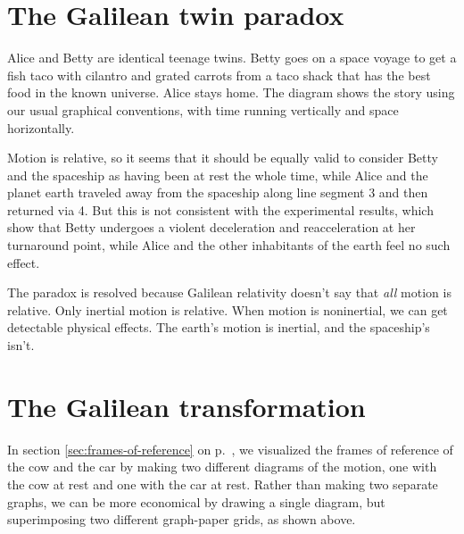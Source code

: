 \section{The Galilean twin paradox}\label{sec:galilean-twin-paradox}

Alice and Betty are identical teenage twins. Betty goes on a space voyage to get a fish taco with
cilantro and grated carrots from a
taco shack that has the best food in the known universe. Alice stays home. The diagram shows the story using our usual
graphical conventions, with time running vertically and space horizontally.

\begin{figure}[h]\label{fig:galilean-twin-paradox}
\end{figure}

Motion is relative, so it seems that it should be equally valid to consider Betty
and the spaceship as having been at rest the whole time, while
Alice and the planet earth traveled away from the spaceship along
line segment 3 and then returned via 4. But this is not consistent with the
experimental results, which show that Betty undergoes a violent
deceleration and reacceleration at her turnaround point, while Alice and the other
inhabitants of the earth feel no such effect.

The paradox is resolved because Galilean relativity doesn't say that \emph{all}
motion is relative. Only inertial motion is relative. When motion is noninertial, we can get detectable
physical effects. The earth's motion is inertial, and the spaceship's isn't.


\pagebreak

\section{The Galilean transformation}\label{sec:galilean-transformation}

\begin{figure}\label{fig:galilean-transformation}
\end{figure}

In section \ref{sec:frames-of-reference} on p.~\pageref{sec:frames-of-reference}, we visualized the frames of reference
of the cow and the car by making two different diagrams of the motion, one with the cow at rest and one with the car
at rest. Rather than making two separate graphs, we can be more economical by drawing a single diagram,
but superimposing two different graph-paper grids, as shown above.

